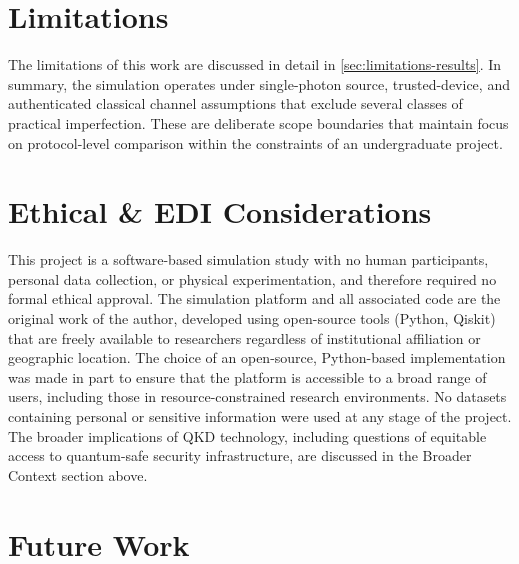 \documentclass[10pt, a4paper]{report}
\begin{document}

\section{Limitations}

The limitations of this work are discussed in detail in \cref{sec:limitations-results}. In summary, the simulation operates under single-photon source, trusted-device, and authenticated classical channel assumptions that exclude several classes of practical imperfection. These are deliberate scope boundaries that maintain focus on protocol-level comparison within the constraints of an undergraduate project.




\section{Ethical \& EDI Considerations}

This project is a software-based simulation study with no human participants, personal data collection, or physical experimentation, and therefore required no formal ethical approval. The simulation platform and all associated code are the original work of the author, developed using open-source tools (Python, Qiskit) that are freely available to researchers regardless of institutional affiliation or geographic location. The choice of an open-source, Python-based implementation was made in part to ensure that the platform is accessible to a broad range of users, including those in resource-constrained research environments. No datasets containing personal or sensitive information were used at any stage of the project. The broader implications of QKD technology, including questions of equitable access to quantum-safe security infrastructure, are discussed in the Broader Context section above.


\section{Future Work}
\label{sec:future-work}
\end{document}
